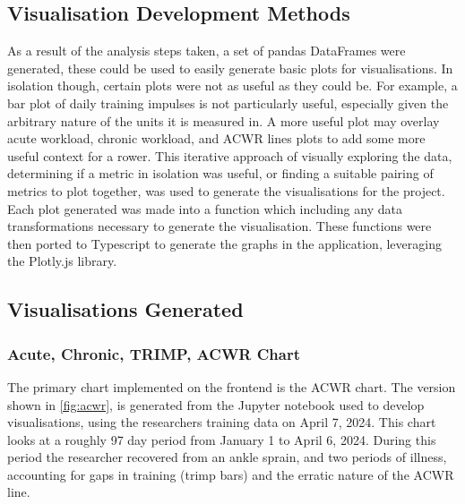 \subsection{Visualisation Development Methods}
As a result of the analysis steps taken, a set of pandas DataFrames were generated, these could be used to easily generate basic plots for visualisations. In isolation though, certain plots were not as useful as they could be. For example, a bar plot of daily training impulses is not particularly useful, especially given the arbitrary nature of the units it is measured in. A more useful plot may overlay acute workload, chronic workload, and ACWR lines plots to add some more useful context for a rower. This iterative approach of visually exploring the data, determining if a metric in isolation was useful, or finding a suitable pairing of metrics to plot together, was used to generate the visualisations for the project. Each plot generated was made into a function which including any data transformations necessary to generate the visualisation. These functions were then ported to Typescript to generate the graphs in the application, leveraging the Plotly.js library.

\subsection{Visualisations Generated}
\subsubsection{Acute, Chronic, TRIMP, ACWR Chart}
The primary chart implemented on the frontend is the ACWR chart. The version shown in \autoref{fig:acwr}, is generated from the Jupyter notebook used to develop visualisations, using the researchers training data on April 7, 2024. This chart looks at a roughly 97 day period from January 1 to April 6, 2024. During this period the researcher recovered from an ankle sprain, and two periods of illness, accounting for gaps in training (trimp bars) and the erratic nature of the ACWR line.

